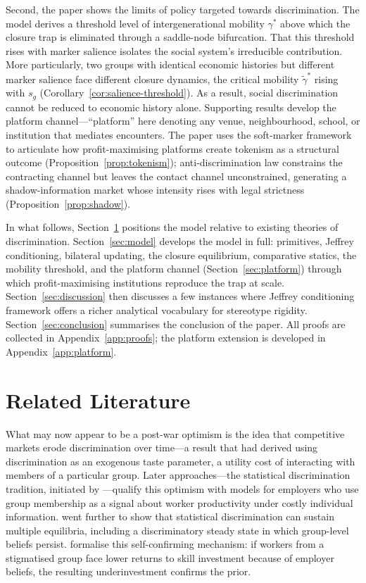 \documentclass[pdflatex,sn-basic]{sn-jnl}
\theoremstyle{thmstyleone}
\numberwithin{proposition}{subsection}
\begin{document}
Second, the paper shows the limits of policy targeted towards discrimination. The model derives a
threshold level of intergenerational mobility $\gamma^*$ above which the
closure trap is eliminated through a saddle-node bifurcation. That this threshold rises with marker salience isolates the social system's irreducible contribution. More particularly, two groups with identical economic histories but different marker salience face different closure dynamics, the critical mobility $\tilde{\gamma}^*$ rising with $s_g$ (Corollary~\ref{cor:salience-threshold}). As a result, social discrimination cannot be reduced to economic history alone. Supporting results develop the platform channel---``platform'' here denoting any venue, neighbourhood, school, or institution that
mediates encounters. The paper uses the soft-marker framework to articulate how profit-maximising platforms create tokenism as
a structural outcome (Proposition~\ref{prop:tokenism});
anti-discrimination law constrains the contracting channel but
leaves the contact channel unconstrained, generating a
shadow-information market whose intensity rises with legal
strictness (Proposition~\ref{prop:shadow}).

In what follows, Section~\ref{sec:lit} positions
the model relative to existing theories of discrimination.
Section~\ref{sec:model} develops the model in full: primitives,
Jeffrey conditioning, bilateral updating, the closure equilibrium,
comparative statics, the mobility threshold, and the platform
channel (Section~\ref{sec:platform}) through which profit-maximising
institutions reproduce the trap at scale.
Section~\ref{sec:discussion} then discusses a few instances where Jeffrey conditioning framework offers a richer analytical vocabulary for stereotype rigidity. Section~\ref{sec:conclusion} summarises the conclusion of the paper. All
proofs are collected in Appendix~\ref{app:proofs}; the platform extension
is developed in Appendix~\ref{app:platform}. 

\section{Related Literature}
\label{sec:lit}

What may now appear to be a post-war optimism is the idea that competitive
markets erode discrimination over time---a result that
\citet{Becker1957} had derived using discrimination as an exogenous taste
parameter, a utility cost of interacting with members of a particular
group. Later approaches---the statistical discrimination tradition, initiated by
\citet{Phelps1972}---qualify this optimism with models for employers who use group membership as a
signal about worker productivity under costly individual information.
\citet{Arrow1973} went further to show that statistical discrimination can sustain
multiple equilibria, including a discriminatory steady state in which
group-level beliefs persist. \citet{CoateLoury1993} formalise this
self-confirming mechanism: if workers from a stigmatised group face
lower returns to skill investment because of employer beliefs, the
resulting underinvestment confirms the prior.
\end{document}
